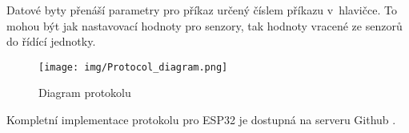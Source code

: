 Datové byty přenáší parametry pro příkaz určený číslem příkazu v~hlavičce.
To mohou být jak nastavovací hodnoty pro senzory, tak hodnoty vracené ze senzorů do řídící jednotky.

\begin{figure}[h]
    \begin{small}
        \begin{center}
            \texttt{[image: img/Protocol\_diagram.png]}
        \end{center}
        \caption{Diagram protokolu}
        \label{fig: Diagram protokolu}
    \end{small}
\end{figure}




Kompletní implementace protokolu pro ESP32 je dostupná na serveru Github \cite{protocol}. 


